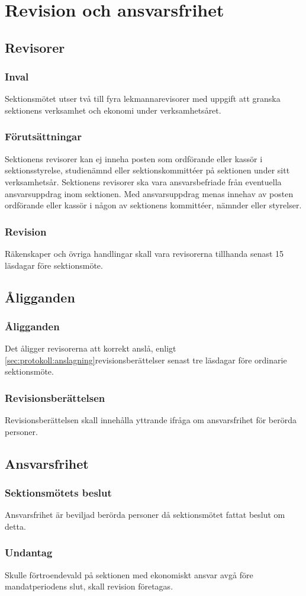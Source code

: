 \section{Revision och ansvarsfrihet}

\subsection{Revisorer}

\subsubsection{Inval}
Sektionsmötet utser två till fyra lekmannarevisorer med uppgift att granska sektionens verksamhet och ekonomi under verksamhetsåret.

\subsubsection{Förutsättningar}
Sektionens revisorer kan ej inneha posten som ordförande eller kassör i sektionsstyrelse, studienämnd eller sektionskommittéer på sektionen under sitt verksamhetsår. Sektionens revisorer ska vara ansvarsbefriade från eventuella ansvarsuppdrag inom sektionen. Med ansvarsuppdrag menas innehav av posten ordförande eller kassör i någon av sektionens kommittéer, nämnder eller styrelser.

\subsubsection{Revision}
Räkenskaper och övriga handlingar skall vara revisorerna tillhanda senast 15 läsdagar före sektionsmöte.

\subsection{Åligganden}

\subsubsection{Åligganden}
Det åligger revisorerna att korrekt anslå, enligt \ref{sec:protokoll:anslagning}revisionsberättelser senast tre läsdagar före ordinarie sektionsmöte.

\subsubsection{Revisionsberättelsen}
Revisionsberättelsen skall innehålla yttrande ifråga om ansvarsfrihet för berörda personer.

\subsection{Ansvarsfrihet}

\subsubsection{Sektionsmötets beslut}
Ansvarsfrihet är beviljad berörda personer då sektionsmötet fattat beslut om detta.

\subsubsection{Undantag}
Skulle förtroendevald på sektionen med ekonomiskt ansvar avgå före mandatperiodens slut, skall revision företagas.